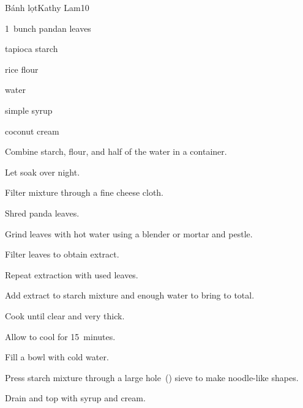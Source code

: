 \begin{recipe}{B\'anh l\d{o}t}{Kathy Lam}{10}

\begin{ingredients}
\item 1~bunch pandan leaves
\item {} tapioca starch
\item \Tp{1\half} rice flour
\item {} water
\item simple syrup
\item coconut cream
\end{ingredients}

\begin{directions}
\item Combine starch, flour, and half of the water in a container.
\item Let soak over night.
\item Filter mixture through a fine cheese cloth.
\item Shred panda leaves.
\item Grind leaves with hot water using a blender or mortar and pestle.
\item Filter leaves to obtain extract.
\item Repeat extraction with used leaves.
\item Add extract to starch mixture and enough water to bring to total.
\item Cook until clear and very thick.
\item Allow to cool for 15~minutes.
\item Fill a bowl with cold water.
\item Press starch mixture through a large hole~(\cm{\half}) sieve to make noodle-like shapes.
\item Drain and top with syrup and cream.
\end{directions}

\end{recipe}
